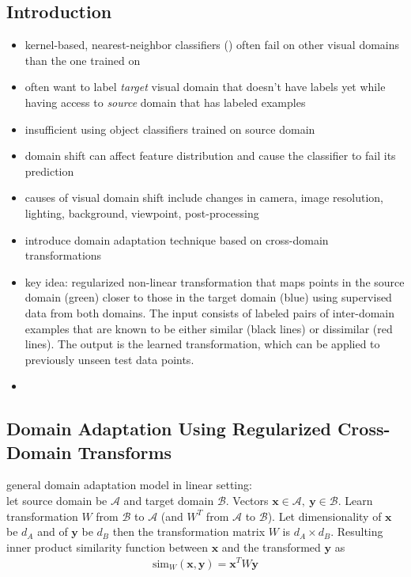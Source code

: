 \subsection{Introduction}
\begin{itemize}
	\item kernel-based, nearest-neighbor classifiers () often fail on other visual domains than the one trained on
	\item often want to label \textit{target} visual domain that doesn't have labels yet while having access to \textit{source} domain that has labeled examples
	\item insufficient using object classifiers trained on source domain 
	\item domain shift can affect feature distribution and cause the classifier to fail its prediction
	\item causes of visual domain shift include changes in camera, image resolution, lighting, background, viewpoint, post-processing 
	\item introduce domain adaptation technique based on cross-domain transformations
	\item key idea: regularized non-linear transformation that maps points in the source domain (green) closer to those in the target domain (blue) using supervised data from both domains. The input consists of labeled pairs of inter-domain examples that are known to be either similar (black lines) or dissimilar (red lines). The output is the learned transformation, which can be applied to previously unseen test data points. 
	\item {}
\end{itemize}

\subsection{Domain Adaptation Using Regularized Cross-Domain Transforms}

general domain adaptation model in linear setting:\\
let source domain be $\mathcal{A}$ and target domain $\mathcal{B}$. Vectors $\mathbf{x} \in \mathcal{A},~\mathbf{y} \in \mathcal{B}$. Learn transformation $W$ from $\mathcal{B}$ to $\mathcal{A}$ (and $W^T$ from $\mathcal{A}$ to $\mathcal{B}$). Let dimensionality of $\mathbf{x}$ be $d_A$ and of $\mathbf{y}$ be $d_B$ then the transformation matrix $W$ is $d_A \times d_B$. Resulting inner product similarity function between $\mathbf{x}$ and the transformed $\mathbf{y}$ as
\begin{align*}
	\text{sim}_W(\mathbf{x}, \mathbf{y}) = \mathbf{x}^T W \mathbf{y}
\end{align*}

